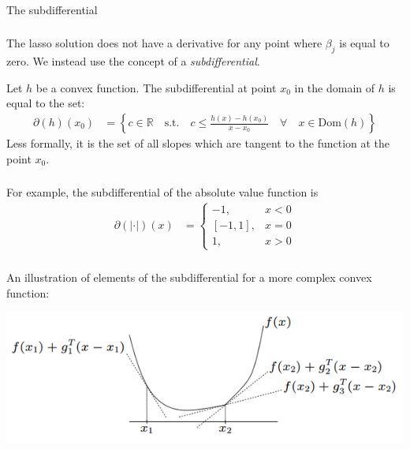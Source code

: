 \begin{frame}[fragile] \frametitle{}

{\color{yaleblue}\fontsize{16pt}{20pt}\selectfont The subdifferential}

\end{frame}

\begin{frame}[fragile] \frametitle{}

The lasso solution does not have a derivative for any point where $\beta_j$ is
equal to zero. We instead use the concept of a \textit{subdifferential}.

\pause Let $h$ be a convex function. The subdifferential at point $x_0$ in the
domain of $h$ is equal to the set:
\begin{align*}
\partial(h)(x_0 ) &= \left\{ c \in \mathbb{R} \quad \text{s.t.} \quad c \leq \frac{h(x) - h(x_0)}{x - x_0} \quad \forall \quad x \in
\text{Dom}(h) \right\}
\end{align*}
Less formally, it is the set of all slopes which are tangent to the function at the point $x_0$.

\end{frame}


\begin{frame}[fragile] \frametitle{}

For example, the subdifferential of the absolute value function is
\begin{align*}
\partial(| \cdot |)(x) &= \left\{ \begin{array}{ll} -1, &x < 0 \\[0pt] [-1,1], &x = 0 \\ 1, &x > 0 \end{array} \right.
\end{align*}

\end{frame}

\begin{frame}[fragile] \frametitle{}

An illustration of elements of the subdifferential for a more complex
convex function:
\begin{center}
\includegraphics[width=\textwidth]{img/img02.png}
\end{center}

\end{frame}

